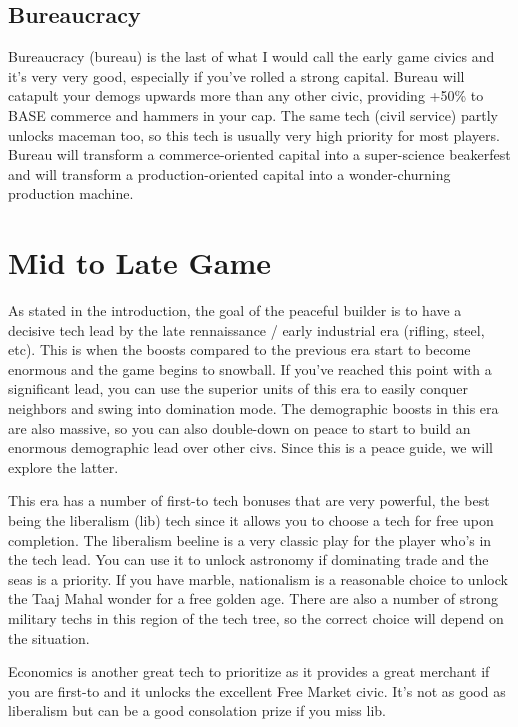 \documentclass[10pt]{article}
\begin{document}
\subsection*{Bureaucracy}

Bureaucracy (bureau) is the last of what I would call the early game
civics and it's very very good, especially if you've rolled a strong
capital. Bureau will catapult your demogs upwards more than any other
civic, providing +50\% to BASE commerce and hammers in your cap. The
same tech (civil service) partly unlocks maceman too, so this tech is
usually very high priority for most players. Bureau will transform a
commerce-oriented capital into a super-science beakerfest and will
transform a production-oriented capital into a wonder-churning
production machine.

\section*{Mid to Late Game}

As stated in the introduction, the goal of the peaceful builder is to
have a decisive tech lead by the late rennaissance / early industrial
era (rifling, steel, etc). This is when the boosts compared to the
previous era start to become enormous and the game begins to
snowball. If you've reached this point with a significant lead, you
can use the superior units of this era to easily conquer neighbors and
swing into domination mode. The demographic boosts in this era are
also massive, so you can also double-down on peace to start to build
an enormous demographic lead over other civs. Since this is a peace
guide, we will explore the latter.

This era has a number of first-to tech bonuses that are very powerful,
the best being the liberalism (lib) tech since it allows you to choose
a tech for free upon completion. The liberalism beeline is a very
classic play for the player who's in the tech lead. You can use it to
unlock astronomy if dominating trade and the seas is a priority. If
you have marble, nationalism is a reasonable choice to unlock the Taaj
Mahal wonder for a free golden age. There are also a number of strong
military techs in this region of the tech tree, so the correct choice
will depend on the situation.

Economics is another great tech to prioritize as it provides a great
merchant if you are first-to and it unlocks the excellent Free Market
civic. It's not as good as liberalism but can be a good consolation
prize if you miss lib.
\end{document}
